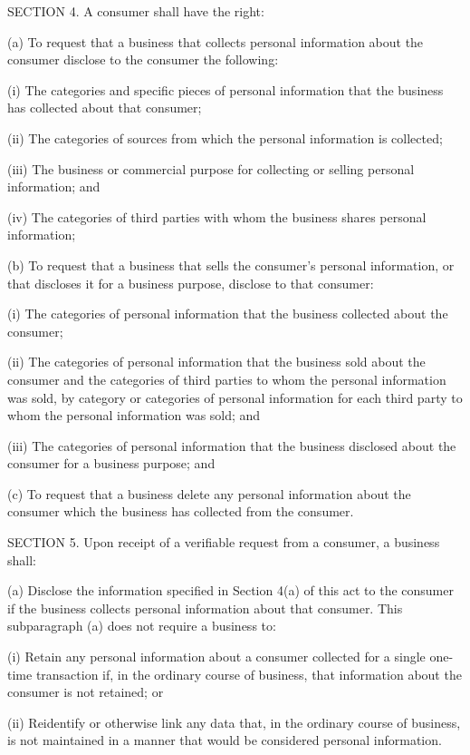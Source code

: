      SECTION 4.  A consumer shall have the right:

          (a)  To request that a business that collects personal information about the consumer disclose to the consumer the following:

              (i)  The categories and specific pieces of personal information that the business has collected about that consumer;

              (ii)  The categories of sources from which the personal information is collected;

              (iii)  The business or commercial purpose for collecting or selling personal information; and

              (iv)  The categories of third parties with whom the business shares personal information;

          (b)  To request that a business that sells the consumer's personal information, or that discloses it for a business purpose, disclose to that consumer:

              (i)  The categories of personal information that the business collected about the consumer;

              (ii)  The categories of personal information that the business sold about the consumer and the categories of third parties to whom the personal information was sold, by category or categories of personal information for each third party to whom the personal information was sold; and

              (iii)  The categories of personal information that the business disclosed about the consumer for a business purpose; and

          (c)  To request that a business delete any personal information about the consumer which the business has collected from the consumer.

     SECTION 5.  Upon receipt of a verifiable request from a consumer, a business shall:

          (a)  Disclose the information specified in Section 4(a) of this act to the consumer if the business collects personal information about that consumer.  This subparagraph (a) does not require a business to:

              (i)  Retain any personal information about a consumer collected for a single one-time transaction if, in the ordinary course of business, that information about the consumer is not retained; or

              (ii)  Reidentify or otherwise link any data that, in the ordinary course of business, is not maintained in a manner that would be considered personal information.

